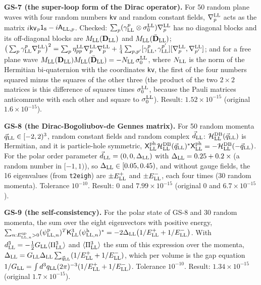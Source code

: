\documentclass[
  10pt,
]{article}
\begin{document}
\textbf{GS-7 (the super-loop form of the Dirac operator).} For 50 random
plane waves with four random numbers \texttt{kv} and random constant
fields, \(\nabla^{\rm LL}_p\) acts as the matrix
\(i\)\texttt{kv}\(_p\mathsf 1_8-i\mathsf A_{{\rm LL},p}\). Checked:
\(\sum_p(\gamma^p_{\rm LL}\otimes\sigma^{\rm LL}_0)\nabla^{\rm LL}_p\)
has no diagonal blocks and its off-diagonal blocks are
\(M_{\rm LL}(\mathbf D_{\rm LL})\) and
\(M_{\rm LL}(\bar{\mathbf D}_{\rm LL})\);
\(\big(\sum_p\gamma^p_{\rm LL}\nabla^{\rm LL}_p\big)^2=\sum_p\eta^{\rm LL}_{pp}\nabla^{\rm LL}_p\nabla^{\rm LL}_p+\tfrac14\sum_{p,p'}[\gamma^p_{\rm LL},\gamma^{p'}_{\rm LL}][\nabla^{\rm LL}_p,\nabla^{\rm LL}_{p'}]\);
and for a free plane wave
\(M_{\rm LL}(\mathbf D_{\rm LL})M_{\rm LL}(\bar{\mathbf D}_{\rm LL})=-N_{\rm LL}\,\sigma^{\rm LL}_0\),
where \(N_{\rm LL}\) is the norm of the Hermitian bi-quaternion with the
coordinates \texttt{kv}, the first of the four numbers squared minus the
squares of the other three (the product of the two \(2\times2\) matrices
is this difference of squares times \(\sigma^{\rm LL}_0\), because the
Pauli matrices anticommute with each other and square to
\(\sigma^{\rm LL}_0\)). Result: \(1.52\times10^{-15}\) (original
\(1.6\times10^{-15}\)).

\textbf{GS-8 (the Dirac-Bogoliubov-de Gennes matrix).} For 50 random
momenta \(\vec q_{\rm LL}\in[-2,2)^3\), random constant fields and
random complex \(\vec d_{\rm LL}\):
\(\mathcal H^{\rm DB}_{\rm LL}(\vec q_{\rm LL})\) is Hermitian, and it
is particle-hole symmetric,
\(\mathsf X^{\rm ph}_{\rm LL}\mathcal H^{\rm DB}_{\rm LL}(\vec q_{\rm LL})^*\mathsf X^{\rm ph}_{\rm LL}=-\mathcal H^{\rm DB}_{\rm LL}(-\vec q_{\rm LL})\).
For the polar order parameter \(\vec d_{\rm LL}=(0,0,\Delta_{\rm LL})\)
with \(\Delta_{\rm LL}=0.25+0.2\times{}\)(a random number in
\([-1,1)\)), so \(\Delta_{\rm LL}\in[0.05,0.45)\), and without gauge
fields, the 16 eigenvalues (from \texttt{t2eigh}) are
\(\pm E^+_{\rm LL}\) and \(\pm E^-_{\rm LL}\), each four times (30
random momenta). Tolerance \(10^{-10}\). Result: 0 and
\(7.99\times10^{-15}\) (original 0 and \(6.7\times10^{-15}\)).

\textbf{GS-9 (the self-consistency).} For the polar state of GS-8 and 30
random momenta, the sum over the eight eigenvectors with positive
energy,
\(\sum_{n:E^{\rm qp}_{{\rm LL},n}>0}(\psi^{\rm p}_{{\rm LL},n})^T\mathsf K^3_{\rm LL}(\psi^{\rm h}_{{\rm LL},n})^*=-2\Delta_{\rm LL}\big(1/E^+_{\rm LL}+1/E^-_{\rm LL}\big)\).
With \(d^3_{\rm LL}=-\tfrac12G_{\rm LL}\langle\Pi^3_{\rm LL}\rangle\)
and \(\langle\Pi^3_{\rm LL}\rangle\) the sum of this expression over the
momenta,
\(\Delta_{\rm LL}=G_{\rm LL}\Delta_{\rm LL}\sum_{\vec q_{\rm LL}}(1/E^+_{\rm LL}+1/E^-_{\rm LL})\),
which per volume is the gap equation
\(1/G_{\rm LL}=\int d^3q_{\rm LL}(2\pi)^{-3}(1/E^+_{\rm LL}+1/E^-_{\rm LL})\).
Tolerance \(10^{-10}\). Result: \(1.34\times10^{-15}\) (original
\(1.7\times10^{-15}\)).
\end{document}
